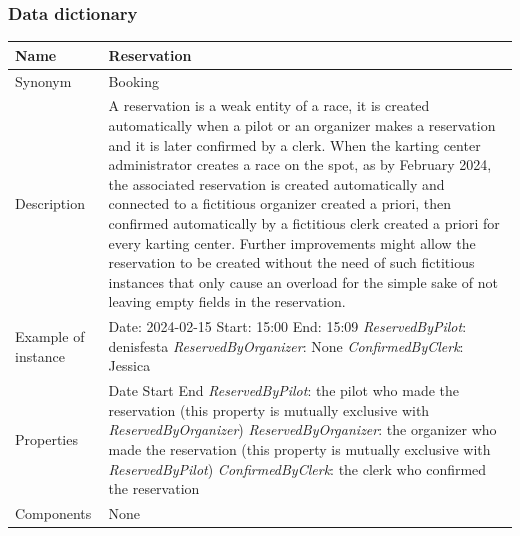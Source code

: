 \documentclass{beamer}
\begin{document}
\begin{frame}
\frametitle{Data dictionary}
\begin{table}
\tiny
\begin{tabular}{|p{2cm}|p{6cm}|}
\hline
Name & \textbf{Reservation} \\
\hline
Synonym & Booking \\
\hline
Description & A reservation is a weak entity of a race,
it is created automatically when a pilot or an organizer 
makes a reservation and it is later confirmed by a clerk.
When the karting center administrator creates 
a race on the spot, as by February 2024, the associated
reservation is created automatically and connected to a 
fictitious organizer created a priori, then confirmed automatically
by a fictitious clerk created a priori for every karting center.
Further improvements might allow the reservation to be created
without the need of such fictitious instances that only 
cause an overload for the simple sake of not leaving empty fields 
in the reservation. \\ 
\hline
Example of instance &
Date: 2024-02-15 \newline
Start: 15:00 \newline
End: 15:09 \newline
\textit{ReservedByPilot}: denisfesta \newline
\textit{ReservedByOrganizer}: None \newline
\textit{ConfirmedByClerk}: Jessica \\
\hline
Properties &
Date \newline
Start \newline
End \newline
\textit{ReservedByPilot}: the pilot who made the reservation (this property 
is mutually exclusive with \textit{ReservedByOrganizer}) \newline
\textit{ReservedByOrganizer}: the organizer who made the reservation (this property
is mutually exclusive with \textit{ReservedByPilot}) \newline
\textit{ConfirmedByClerk}: the clerk who confirmed the reservation \\
\hline
Components & None \\
\hline
\end{tabular}
\end{table}
\end{frame}
\end{document}
